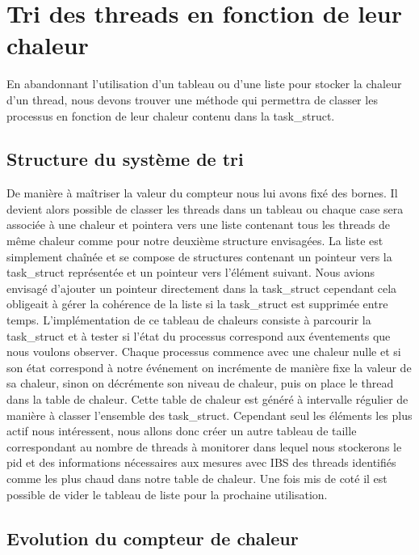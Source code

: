   \section{Tri des threads en fonction de leur chaleur}

    En abandonnant l'utilisation d'un tableau ou d'une liste pour stocker la
    chaleur d'un thread, nous devons trouver une méthode qui permettra de
    classer les processus en fonction de leur chaleur contenu dans la
    task\_struct.

    \subsection{Structure du système de tri}

      De manière à maîtriser la valeur du compteur nous lui avons fixé des
      bornes. Il devient alors possible de classer les threads dans un tableau
      ou chaque case sera associée à une chaleur et pointera vers une liste
      contenant tous les threads de même chaleur comme pour notre deuxième
      structure envisagées.  La liste est simplement chaînée et se compose de
      structures contenant un pointeur vers la task\_struct représentée et un
      pointeur vers l'élément suivant. Nous avions envisagé d'ajouter un
      pointeur directement dans la task\_struct cependant cela obligeait à gérer
      la cohérence de la liste si la task\_struct est supprimée entre temps.
      L'implémentation de ce tableau de chaleurs consiste à parcourir la
      task\_struct et à tester si l'état du processus correspond aux éventements
      que nous voulons observer. Chaque processus commence avec une chaleur
      nulle et si son état correspond à notre événement on incrémente de manière
      fixe la valeur de sa chaleur, sinon on décrémente son niveau de chaleur,
      puis on place le thread dans la table de chaleur.  Cette table de chaleur
      est généré à intervalle régulier de manière à classer l'ensemble des
      task\_struct. Cependant seul les éléments les plus actif nous intéressent,
      nous allons donc créer un autre tableau de taille correspondant au nombre
      de threads à monitorer dans lequel nous stockerons le pid et des
      informations nécessaires aux mesures avec IBS des threads identifiés comme
      les plus chaud dans notre table de chaleur. Une fois mis de coté il est
      possible de vider le tableau de liste pour la prochaine utilisation.

    \subsection{Evolution du compteur de chaleur}

